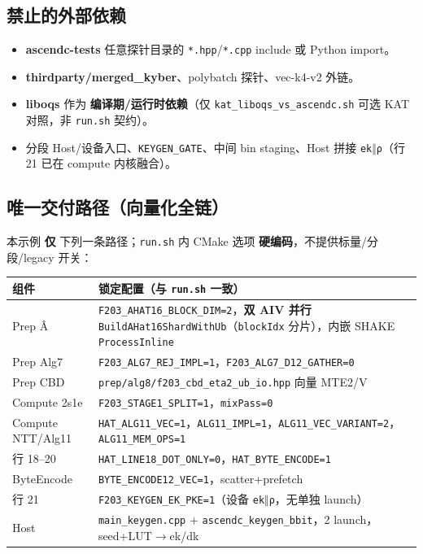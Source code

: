 \documentclass[UTF8,a4paper,11pt]{ctexart}
\begin{document}
\subsection{禁止的外部依赖}

\begin{itemize}
  \item \textbf{ascendc-tests} 任意探针目录的 \texttt{*.hpp}/\texttt{*.cpp} include 或 Python import。
  \item \textbf{thirdparty/merged\_kyber}、polybatch 探针、vec-k4-v2 外链。
  \item \textbf{liboqs} 作为 \textbf{编译期/运行时依赖}（仅 \texttt{kat\_liboqs\_vs\_ascendc.sh} 可选 KAT 对照，非 \texttt{run.sh} 契约）。
  \item 分段 Host/设备入口、\texttt{KEYGEN\_GATE}、中间 bin staging、Host 拼接 \texttt{ek$\Vert$ρ}（行 21 已在 compute 内核融合）。
\end{itemize}

\subsection{唯一交付路径（向量化全链）}

本示例 \textbf{仅} 下列一条路径；\texttt{run.sh} 内 CMake 选项 \textbf{硬编码}，不提供标量/分段/legacy 开关：

\begin{longtable}{@{}L{4.2cm}L{8.8cm}@{}}
\toprule
组件 & 锁定配置（与 \texttt{run.sh} 一致） \\
\midrule
Prep Â & \texttt{F203\_AHAT16\_BLOCK\_DIM=2}，\textbf{双 AIV 并行} \texttt{BuildAHat16ShardWithUb}（\texttt{blockIdx} 分片），内嵌 SHAKE \texttt{ProcessInline} \\
Prep Alg7 & \texttt{F203\_ALG7\_REJ\_IMPL=1}，\texttt{F203\_ALG7\_D12\_GATHER=0} \\
Prep CBD & \texttt{prep/alg8/f203\_cbd\_eta2\_ub\_io.hpp} 向量 MTE2/V \\
Compute 2s1e & \texttt{F203\_STAGE1\_SPLIT=1}，\texttt{mixPass=0} \\
Compute NTT/Alg11 & \texttt{HAT\_ALG11\_VEC=1}，\texttt{ALG11\_IMPL=1}，\texttt{ALG11\_VEC\_VARIANT=2}，\texttt{ALG11\_MEM\_OPS=1} \\
行 18--20 & \texttt{HAT\_LINE18\_DOT\_ONLY=0}，\texttt{HAT\_BYTE\_ENCODE=1} \\
ByteEncode & \texttt{BYTE\_ENCODE12\_VEC=1}，scatter+prefetch \\
行 21 & \texttt{F203\_KEYGEN\_EK\_PKE=1}（设备 \texttt{ek$\Vert$ρ}，无单独 launch） \\
Host & \texttt{main\_keygen.cpp} + \texttt{ascendc\_keygen\_bbit}，2 launch，seed+LUT$\to$ek/dk \\
\bottomrule
\end{longtable}
\end{document}
